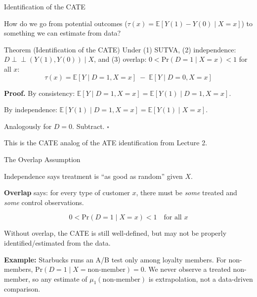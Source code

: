 \documentclass[aspectratio=169, 11pt]{beamer}
\newcommand{\E}{\mathbb{E}}
\newcommand{\Prob}{\mathrm{Pr}}
\newcommand{\indep}{\perp\!\!\!\perp}
\begin{document}
\begin{frame}{Identification of the CATE}
 
How do we go from potential outcomes ($\tau(x) = \E[Y(1) - Y(0) \mid X = x]$) to something we can estimate from data?
 
\bigskip
 
\begin{block}{Theorem (Identification of the CATE)}
Under (1) SUTVA, (2) independence: $D \indep (Y(1), Y(0)) \mid X$, and (3) overlap: $0 < \Prob(D = 1 \mid X = x) < 1$ for all $x$:
\[
\tau(x) = \E[Y \mid D = 1, X = x] \;-\; \E[Y \mid D = 0, X = x]
\]
\end{block}
 
\bigskip
 
\textbf{Proof.} By consistency: $\E[Y \mid D\!=\!1, X\!=\!x] = \E[Y(1) \mid D\!=\!1, X\!=\!x]$.
 
By independence: $\E[Y(1) \mid D\!=\!1, X\!=\!x] = \E[Y(1) \mid X\!=\!x]$.
 
Analogously for $D = 0$. Subtract. $\square$
 
\bigskip
 
This is the CATE analog of the ATE identification from Lecture 2.
\end{frame}
 
\begin{frame}{The Overlap Assumption}
 
Independence says treatment is ``as good as random'' given $X$.
 
\bigskip
 
\textbf{Overlap} says: for every type of customer $x$, there must be \emph{some} treated and \emph{some} control observations.
 
\[
0 < \Prob(D = 1 \mid X = x) < 1 \quad \text{for all } x
\]
 
\bigskip
 
Without overlap, the CATE is still well-defined, but may not be properly identified/estimated from the data.
 
\bigskip
 
\textbf{Example:} Starbucks runs an A/B test only among loyalty members. For non-members, $\Prob(D = 1 \mid X = \text{non-member}) = 0$. We never observe a treated non-member, so any estimate of $\mu_1(\text{non-member})$ is extrapolation, not a data-driven comparison.
\end{frame}
 
\end{document}
